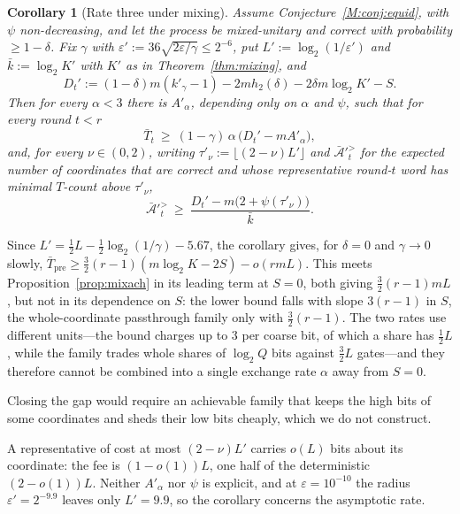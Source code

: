 \documentclass[aps,prx,twocolumn,superscriptaddress,nofootinbib,longbibliography]{revtex4-2}
\theoremstyle{plain}
\newtheorem{corollary}{Corollary}
\theoremstyle{definition}
\theoremstyle{remark}
\newcommand{\Tpre}{T_{\mathrm{pre}}}
\begin{document}
\begin{corollary}[Rate three under mixing]\label{cor:mixq}
Assume Conjecture~\ref{M:conj:equid}, with $\psi$ non-decreasing, and let the process be mixed-unitary and correct with probability $\ge1-\delta$. Fix $\gamma$ with $\varepsilon':=36\sqrt{2\varepsilon/\gamma}\le2^{-6}$, put $L':=\log_2(1/\varepsilon')$ and $\bar k:=\log_2K'$ with $K'$ as in Theorem~\ref{thm:mixing}, and
\[
D_t':=(1-\delta)m(k'_\gamma-1)-2mh_2(\delta)-2\delta m\log_2K'-S.
\]
Then for every $\alpha<3$ there is $A'_\alpha$, depending only on $\alpha$ and $\psi$, such that for every round $t<r$
\begin{equation}\label{eq:mixrate}
\bar T_t\ \ge\ (1-\gamma)\,\alpha\,\big(D_t'-mA'_\alpha\big),
\end{equation}
and, for every $\nu\in(0,2)$, writing $\tau'_\nu:=\lfloor(2-\nu)L'\rfloor$ and $\bar{\mathcal A}'^{>}_t$ for the expected number of coordinates that are correct and whose representative round-$t$ word has minimal $T$-count above $\tau'_\nu$,
\begin{equation}\label{eq:mixactive}
\bar{\mathcal A}'^{>}_t\ \ge\ \frac{D_t'-m\big(2+\psi(\tau'_\nu)\big)}{\bar k}.
\end{equation}
\end{corollary}
Since $L'=\tfrac12L-\tfrac12\log_2(1/\gamma)-5.67$, the corollary gives, for $\delta=0$ and $\gamma\to0$ slowly, $\bar\Tpre\ge\tfrac32(r-1)(m\log_2K-2S)-o(rmL)$. This meets Proposition~\ref{prop:mixach} in its leading term at $S=0$, both giving $\tfrac32(r-1)mL$, but not in its dependence on $S$: the lower bound falls with slope $3(r-1)$ in $S$, the whole-coordinate passthrough family only with $\tfrac32(r-1)$. The two rates use different units---the bound charges up to $3$ per coarse bit, of which a share has $\tfrac12L$, while the family trades whole shares of $\log_2Q$ bits against $\tfrac32L$ gates---and they therefore cannot be combined into a single exchange rate $\alpha$ away from $S=0$. 

Closing the gap would require an achievable family that keeps the high bits of some coordinates and sheds their low bits cheaply, which we do not construct. 

A representative of cost at most $(2-\nu)L'$ carries $o(L)$ bits about its coordinate: the fee is $(1-o(1))L$, one half of the deterministic $(2-o(1))L$. Neither $A'_\alpha$ nor $\psi$ is explicit, and at $\varepsilon=10^{-10}$ the radius $\varepsilon'=2^{-9.9}$ leaves only $L'=9.9$, so the corollary concerns the asymptotic rate.
\end{document}
